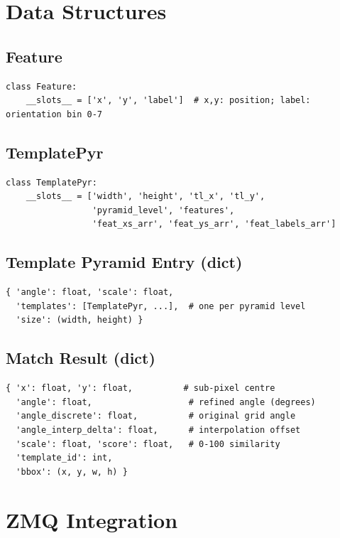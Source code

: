 \documentclass[11pt,a4paper]{article}
\begin{document}
\section{Data Structures}

\subsection{Feature}
\begin{lstlisting}
class Feature:
    __slots__ = ['x', 'y', 'label']  # x,y: position; label: orientation bin 0-7
\end{lstlisting}

\subsection{TemplatePyr}
\begin{lstlisting}
class TemplatePyr:
    __slots__ = ['width', 'height', 'tl_x', 'tl_y',
                 'pyramid_level', 'features',
                 'feat_xs_arr', 'feat_ys_arr', 'feat_labels_arr']
\end{lstlisting}

\subsection{Template Pyramid Entry (dict)}
\begin{lstlisting}
{ 'angle': float, 'scale': float,
  'templates': [TemplatePyr, ...],  # one per pyramid level
  'size': (width, height) }
\end{lstlisting}

\subsection{Match Result (dict)}
\begin{lstlisting}
{ 'x': float, 'y': float,          # sub-pixel centre
  'angle': float,                   # refined angle (degrees)
  'angle_discrete': float,          # original grid angle
  'angle_interp_delta': float,      # interpolation offset
  'scale': float, 'score': float,   # 0-100 similarity
  'template_id': int,
  'bbox': (x, y, w, h) }
\end{lstlisting}

\section{ZMQ Integration}
\end{document}
